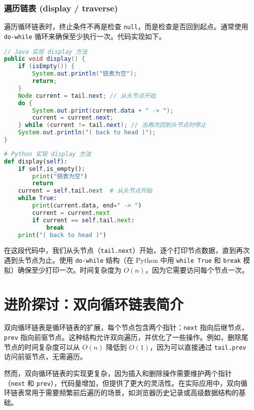 \subsection{遍历链表 (display / traverse)}
遍历循环链表时，终止条件不再是检查 \texttt{null}，而是检查是否回到起点。通常使用 \texttt{do-while} 循环来确保至少执行一次。代码实现如下。\par
\begin{lstlisting}[language=java]
// Java 实现 display 方法
public void display() {
    if (isEmpty()) {
        System.out.println("链表为空");
        return;
    }
    Node current = tail.next; // 从头节点开始
    do {
        System.out.print(current.data + " -> ");
        current = current.next;
    } while (current != tail.next); // 当再次回到头节点时停止
    System.out.println("( back to head )");
}
\end{lstlisting}
\begin{lstlisting}[language=python]
# Python 实现 display 方法
def display(self):
    if self.is_empty():
        print("链表为空")
        return
    current = self.tail.next  # 从头节点开始
    while True:
        print(current.data, end=" -> ")
        current = current.next
        if current == self.tail.next:
            break
    print("( back to head )")
\end{lstlisting}
在这段代码中，我们从头节点（\texttt{tail.next}）开始，逐个打印节点数据，直到再次遇到头节点为止。使用 \texttt{do-while} 结构（在 Python 中用 \texttt{while True} 和 \texttt{break} 模拟）确保至少打印一次。时间复杂度为 $O(n)$，因为它需要访问每个节点一次。\par
\chapter{进阶探讨：双向循环链表简介}
双向循环链表是循环链表的扩展，每个节点包含两个指针：\texttt{next} 指向后继节点，\texttt{prev} 指向前驱节点。这种结构允许双向遍历，并优化了一些操作。例如，删除尾节点的时间复杂度可以从 $O(n)$ 降低到 $O(1)$，因为可以直接通过 \texttt{tail.prev} 访问前驱节点，无需遍历。\par
然而，双向循环链表的实现更复杂，因为插入和删除操作需要维护两个指针（\texttt{next} 和 \texttt{prev}），代码量增加，但提供了更大的灵活性。在实际应用中，双向循环链表常用于需要频繁前后遍历的场景，如浏览器历史记录或高级数据结构的基础。\par
